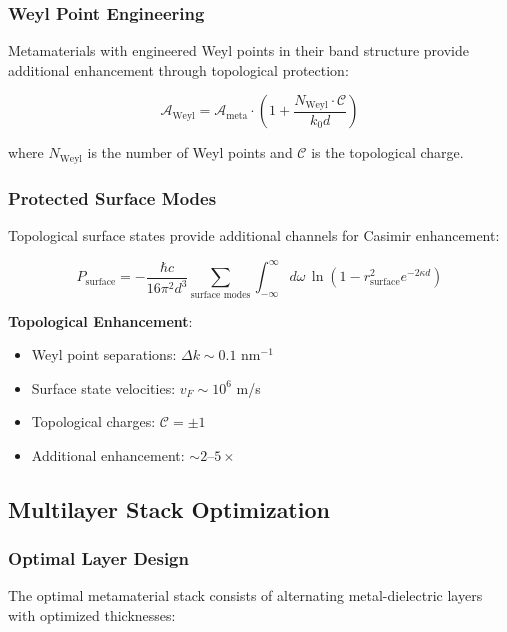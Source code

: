 \subsubsection{Weyl Point Engineering}

Metamaterials with engineered Weyl points in their band structure provide additional enhancement through topological protection:

\begin{equation}
\mathcal{A}_{\text{Weyl}} = \mathcal{A}_{\text{meta}} \cdot \left(1 + \frac{N_{\text{Weyl}} \cdot \mathcal{C}}{k_0 d}\right)
\end{equation}

where $N_{\text{Weyl}}$ is the number of Weyl points and $\mathcal{C}$ is the topological charge.

\subsubsection{Protected Surface Modes}

Topological surface states provide additional channels for Casimir enhancement:

\begin{equation}
P_{\text{surface}} = -\frac{\hbar c}{16\pi^2 d^3} \sum_{\text{surface modes}} \int_{-\infty}^{\infty} d\omega \, \ln(1 - r_{\text{surface}}^2 e^{-2\kappa d})
\end{equation}

\textbf{Topological Enhancement}:
\begin{itemize}
\item Weyl point separations: $\Delta k \sim 0.1$ nm$^{-1}$
\item Surface state velocities: $v_F \sim 10^6$ m/s
\item Topological charges: $\mathcal{C} = \pm 1$
\item Additional enhancement: $\sim 2$--$5\times$
\end{itemize}

\subsection{Multilayer Stack Optimization}

\subsubsection{Optimal Layer Design}

The optimal metamaterial stack consists of alternating metal-dielectric layers with optimized thicknesses:

